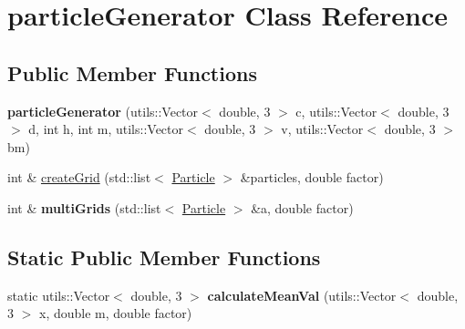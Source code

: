 \hypertarget{classparticle_generator}{}\section{particle\+Generator Class Reference}
\label{classparticle_generator}
\subsection*{Public Member Functions}
\begin{DoxyCompactItemize}
\item 
\mbox{\label{classparticle_generator_af17795ad0318c8b3a9252f3cd4d08b8c}} 
{\bfseries particle\+Generator} (utils\+::\+Vector$<$ double, 3 $>$ c, utils\+::\+Vector$<$ double, 3 $>$ d, int h, int m, utils\+::\+Vector$<$ double, 3 $>$ v, utils\+::\+Vector$<$ double, 3 $>$ bm)
\item 
int \& \mbox{\hyperlink{classparticle_generator_a15769993d769d9ca466eb5d68f3acad2}{create\+Grid}} (std\+::list$<$ \mbox{\hyperlink{class_particle}{Particle}} $>$ \&particles, double factor)
\item 
\mbox{\label{classparticle_generator_a49119d0737c3626c80e6c7568a50dba0}} 
int \& {\bfseries multi\+Grids} (std\+::list$<$ \mbox{\hyperlink{class_particle}{Particle}} $>$ \&a, double factor)
\end{DoxyCompactItemize}
\subsection*{Static Public Member Functions}
\begin{DoxyCompactItemize}
\item 
\mbox{\label{classparticle_generator_aebfd96dacf007343af19281ec5a65593}} 
static utils\+::\+Vector$<$ double, 3 $>$ {\bfseries calculate\+Mean\+Val} (utils\+::\+Vector$<$ double, 3 $>$ x, double m, double factor)
\end{DoxyCompactItemize}
